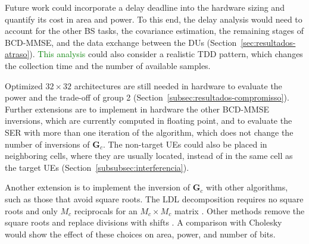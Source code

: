 Future work could incorporate a delay deadline into the hardware sizing and quantify its cost in area and power. To this end, the delay analysis would need to account for the other BS tasks, the covariance estimation, the remaining stages of BCD-MMSE, and the data exchange between the DUs (Section~\ref{sec:resultados-atraso}). \textcolor{GREEN}{This analysis} could also consider a realistic TDD pattern, which changes the collection time and the number of available samples.

Optimized $32 \times 32$ architectures are still needed in hardware to evaluate the power and the trade-off of group 2 (Section~\ref{subsec:resultados-compromisso}). Further extensions are to implement in hardware the other BCD-MMSE inversions, which are currently computed in floating point, and to evaluate the SER with more than one iteration of the algorithm, which does not change the number of inversions of $\mathbf G_c$. The non-target UEs could also be placed in neighboring cells, where they are usually located, instead of in the same cell as the target UEs (Section~\ref{subsubsec:interferencia}).


Another extension is to implement the inversion of $\mathbf G_c$ with other algorithms, such as those that avoid square roots. The LDL decomposition requires no square roots and only $M_c$ reciprocals for an $M_c \times M_c$ matrix \cite{ingemarsson2016ldl}. Other methods remove the square roots and replace divisions with shifts \cite{yu2015inversion}. A comparison with Cholesky would show the effect of these choices on area, power, and number of bits.
